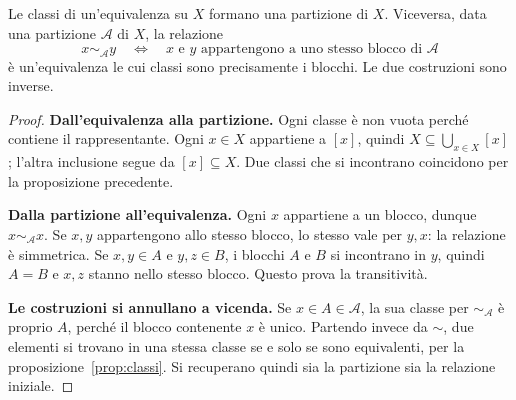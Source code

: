 \begin{teorema}\label{teo:partizioni}
Le classi di un'equivalenza su $X$ formano una partizione di $X$. Viceversa, data una partizione $\mathcal A$ di $X$, la relazione
\[
x\sim_{\mathcal A}y\quad\Longleftrightarrow\quad
\text{$x$ e $y$ appartengono a uno stesso blocco di $\mathcal A$}
\]
è un'equivalenza le cui classi sono precisamente i blocchi. Le due costruzioni sono inverse.
\end{teorema}
\begin{proof}
\textbf{Dall'equivalenza alla partizione.} Ogni classe è non vuota perché contiene il rappresentante. Ogni $x\in X$ appartiene a $[x]$, quindi $X\subseteq\bigcup_{x\in X}[x]$; l'altra inclusione segue da $[x]\subseteq X$. Due classi che si incontrano coincidono per la proposizione precedente.

\textbf{Dalla partizione all'equivalenza.} Ogni $x$ appartiene a un blocco, dunque $x\sim_{\mathcal A}x$. Se $x,y$ appartengono allo stesso blocco, lo stesso vale per $y,x$: la relazione è simmetrica. Se $x,y\in A$ e $y,z\in B$, i blocchi $A$ e $B$ si incontrano in $y$, quindi $A=B$ e $x,z$ stanno nello stesso blocco. Questo prova la transitività.

\textbf{Le costruzioni si annullano a vicenda.} Se $x\in A\in\mathcal A$, la sua classe per $\sim_{\mathcal A}$ è proprio $A$, perché il blocco contenente $x$ è unico. Partendo invece da $\sim$, due elementi si trovano in una stessa classe se e solo se sono equivalenti, per la proposizione~\ref{prop:classi}. Si recuperano quindi sia la partizione sia la relazione iniziale.
\end{proof}

\begin{schema}
\end{schema}


